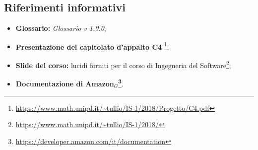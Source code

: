 \subsection{Riferimenti informativi}
\begin{itemize}
	
	\item \textbf{Glossario:} \textit{Glossario v 1.0.0};
	\item \textbf{Presentazione del capitolato d'appalto C4} \footnote{\url{https://www.math.unipd.it/~tullio/IS-1/2018/Progetto/C4.pdf}};
	\item \textbf{Slide del corso:} lucidi forniti per il corso di Ingegneria del Software\footnote{\url{https://www.math.unipd.it/~tullio/IS-1/2018/}};
	\item \textbf{Documentazione di Amazon$_{G}$\footnote{\url{https://developer.amazon.com/it/documentation}}}.
\end{itemize}
